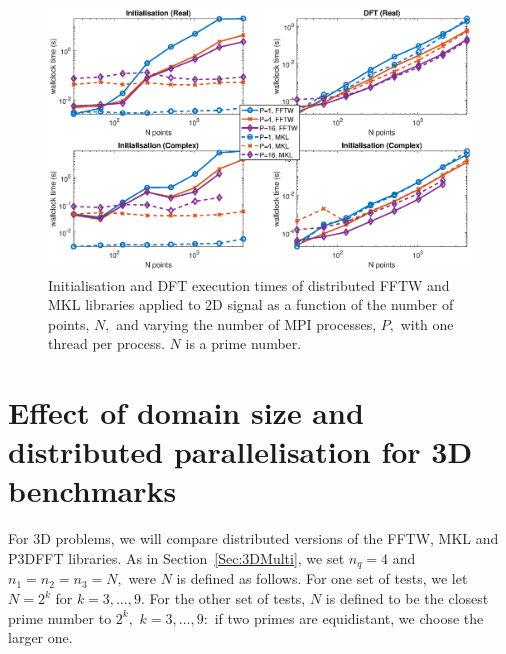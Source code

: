 \documentclass[a4paper]{article}
\begin{document}
\begin{figure}[htb]
    \centering
    \includegraphics[width=0.9\linewidth]{../results/fftw_mkl_prime_2d_mpi.eps}
  \caption{Initialisation and DFT execution times of distributed FFTW and MKL libraries applied to 2D signal as a function of the
    number of points, $N,$ and varying the number of MPI processes, $P,$ with one thread per process. $N$ is a prime number.}
  \label{2DDistFFTWMKLprime}
\end{figure}



\clearpage

\section{Effect of domain size and distributed parallelisation for 3D benchmarks}\label{Sec:3DDistr}
For 3D problems, we will compare distributed versions of the FFTW, MKL
and P3DFFT libraries. As in Section~\ref{Sec:3DMulti}, we set
$n_q=4$ and $n_1=n_2=n_3=N,$ were $N$ is defined as follows.  For one set
of tests, we let $N=2^k$ for $k=3,\ldots,9.$ For the other set of
tests, $N$ is defined to be the closest prime number to $2^k,$
$k=3,\ldots,9:$ if two primes are equidistant, we choose the larger
one.
\end{document}
